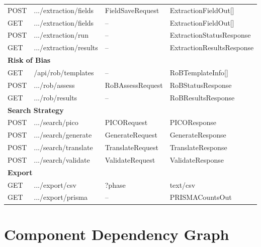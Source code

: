 \documentclass[11pt,a4paper]{article}
\begin{document}
\begin{longtable}{llp{4cm}p{3cm}}
POST & .../extraction/fields & FieldSaveRequest & ExtractionFieldOut[] \\
GET & .../extraction/fields & -- & ExtractionFieldOut[] \\
POST & .../extraction/run & -- & ExtractionStatusResponse \\
GET & .../extraction/results & -- & ExtractionResultsResponse \\
\midrule
\multicolumn{4}{l}{\textbf{Risk of Bias}} \\
GET & /api/rob/templates & -- & RoBTemplateInfo[] \\
POST & .../rob/assess & RoBAssessRequest & RoBStatusResponse \\
GET & .../rob/results & -- & RoBResultsResponse \\
\midrule
\multicolumn{4}{l}{\textbf{Search Strategy}} \\
POST & .../search/pico & PICORequest & PICOResponse \\
POST & .../search/generate & GenerateRequest & GenerateResponse \\
POST & .../search/translate & TranslateRequest & TranslateResponse \\
POST & .../search/validate & ValidateRequest & ValidateResponse \\
\midrule
\multicolumn{4}{l}{\textbf{Export}} \\
GET & .../export/csv & ?phase & text/csv \\
GET & .../export/prisma & -- & PRISMACountsOut \\

\end{longtable}

\section{Component Dependency Graph}
\end{document}

